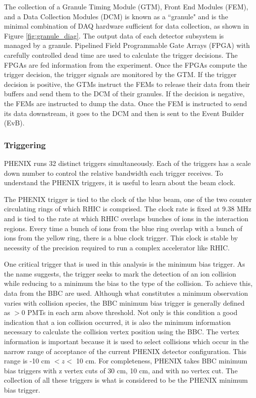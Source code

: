 The collection of a  Granule Timing Module (GTM), Front End Modules (FEM), and a Data Collection Modules (DCM) is known as a ``granule" and is the minimal combination of DAQ hardware sufficient for data collection, as shown in Figure \ref{fig:granule_diag}. The output data of each detector subsystem is managed by a granule. Pipelined Field Programmable Gate Arrays (FPGA) with carefully controlled dead time are used to calculate the trigger decisions. The FPGAs are fed information from the experiment. Once the FPGAs compute the trigger decision, the trigger signals are monitored by the GTM. If the trigger decision is positive, the GTMs instruct the FEMs to release their data from their buffers and send them to the DCM of their granules. If the decision is negative, the FEMs are instructed to dump the data.  Once the FEM is instructed to send its data downstream, it goes to the DCM and then is sent to the Event Builder (EvB).

\subsubsection{Triggering}
PHENIX runs 32 distinct triggers simultaneously. Each of the triggers has a scale down number to control the relative bandwidth each trigger receives. To understand the PHENIX triggers, it is useful to learn about the beam clock.

The PHENIX trigger is tied to the clock of the blue beam, one of the two counter circulating rings of which RHIC is comprised. The clock rate is fixed at 9.38 MHz and is tied to the rate at which RHIC overlaps bunches of ions in the interaction regions. Every time a bunch of ions from the blue ring overlap with a bunch of ions from the yellow ring, there is a blue clock trigger. This clock is stable by necessity of the precision required to run a complex accelerator like RHIC.

One critical trigger that is used in this analysis is the minimum bias trigger. As the name suggests, the trigger seeks to mark the detection of an ion collision while reducing to a minimum the bias to the type of the collision. To achieve this, data from the BBC are used. Although what constitutes a minimum observation varies with collision species, the BBC minimum bias trigger is generally defined as $>$0 PMTs in each arm above threshold. Not only is this condition a good indication that a ion collision occurred, it is also the minimum information necessary to calculate the collision vertex position using the BBC. The vertex information is important because it is used to select collisions which occur in the narrow range of acceptance of the current PHENIX detector configuration. This range is -10 cm $< z<$ 10 cm. For completeness, PHENIX takes BBC minimum bias triggers with z vertex cuts of 30 cm, 10 cm, and with no vertex cut. The collection of all these triggers is what is considered to be the PHENIX minimum bias trigger.

